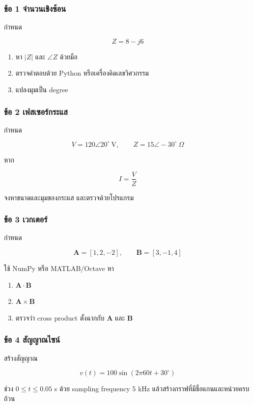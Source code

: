 \subsubsection{ข้อ 1 จำนวนเชิงซ้อน}

กำหนด

\[
Z=8-j6
\]

\begin{enumerate}
    \item หา $|Z|$ และ $\angle Z$ ด้วยมือ
    \item ตรวจคำตอบด้วย Python หรือเครื่องคิดเลขวิศวกรรม
    \item แปลงมุมเป็น degree
\end{enumerate}

\subsubsection{ข้อ 2 เฟสเซอร์กระแส}

กำหนด

\[
V=120\angle 20^\circ\ \text{V},\qquad Z=15\angle -30^\circ\ \Omega
\]

หาก

\[
I=\frac{V}{Z}
\]

จงหาขนาดและมุมของกระแส และตรวจด้วยโปรแกรม

\subsubsection{ข้อ 3 เวกเตอร์}

กำหนด

\[
\mathbf{A}=[1,2,-2],\qquad \mathbf{B}=[3,-1,4]
\]

ใช้ NumPy หรือ MATLAB/Octave หา

\begin{enumerate}
    \item $\mathbf{A}\cdot\mathbf{B}$
    \item $\mathbf{A}\times\mathbf{B}$
    \item ตรวจว่า cross product ตั้งฉากกับ $\mathbf{A}$ และ $\mathbf{B}$
\end{enumerate}

\subsubsection{ข้อ 4 สัญญาณไซน์}

สร้างสัญญาณ

\[
v(t)=100\sin(2\pi60t+30^\circ)
\]

ช่วง $0\le t\le0.05$ s ด้วย sampling frequency 5 kHz แล้วสร้างกราฟที่มีชื่อแกนและหน่วยครบถ้วน

